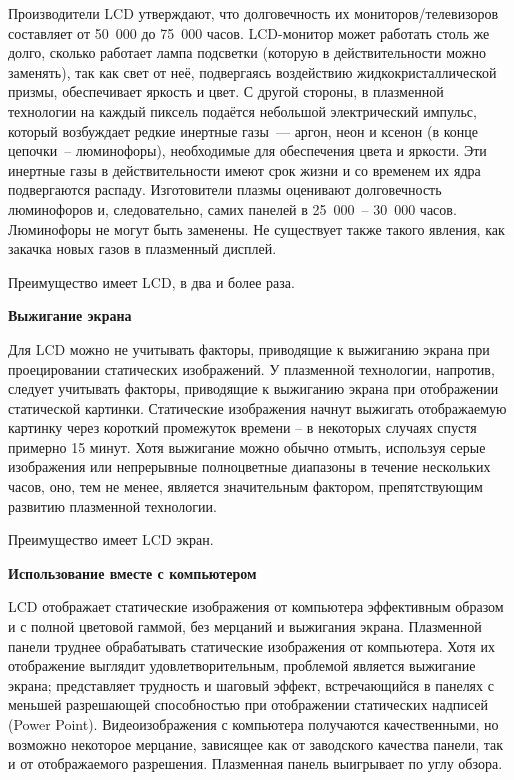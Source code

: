 Производители LCD утверждают, что долговечность их мониторов/телевизоров составляет от 50~000 до 75~000 часов. LCD-монитор может работать столь же долго, сколько работает лампа подсветки (которую в действительности можно заменять), так как свет от неё, подвергаясь воздействию жидкокристаллической призмы, обеспечивает яркость и цвет. С другой стороны, в плазменной технологии на каждый пиксель подаётся небольшой электрический импульс, который возбуждает редкие инертные газы~--- аргон, неон и ксенон (в конце цепочки~-- люминофоры), необходимые для обеспечения цвета и яркости. Эти инертные газы в действительности имеют срок жизни и со временем их ядра подвергаются распаду. Изготовители плазмы оценивают долговечность люминофоров и, следовательно, самих панелей в 25~000~-- 30~000 часов. Люминофоры не могут быть заменены. Не существует также такого явления, как закачка новых газов в плазменный дисплей. 

Преимущество имеет LCD, в два и более раза. 

\begin{flushleft}
\textbf{Выжигание экрана}
\end{flushleft}

Для LCD можно не учитывать факторы, приводящие к выжиганию экрана при проецировании статических изображений. У плазменной технологии, напротив, следует учитывать факторы, приводящие к выжиганию экрана при отображении статической картинки. Статические изображения начнут выжигать отображаемую картинку через короткий промежуток времени -- в некоторых случаях спустя примерно 15 минут. Хотя выжигание можно обычно отмыть, используя серые изображения или непрерывные полноцветные диапазоны в течение нескольких часов, оно, тем не менее, является значительным фактором, препятствующим развитию плазменной технологии. 

Преимущество имеет LCD экран. 

\begin{flushleft}
\textbf{Использование вместе с компьютером}
\end{flushleft}

LCD отображает статические изображения от компьютера эффективным образом и с полной цветовой гаммой, без мерцаний и выжигания экрана. Плазменной панели труднее обрабатывать статические изображения от компьютера. Хотя их отображение выглядит удовлетворительным, проблемой является выжигание экрана; представляет трудность и шаговый эффект, встречающийся в панелях с меньшей разрешающей способностью при отображении статических надписей (Power Point). Видеоизображения с компьютера получаются качественными, но возможно некоторое мерцание, зависящее как от заводского качества панели, так и от отображаемого разрешения. Плазменная панель выигрывает по углу обзора. 

